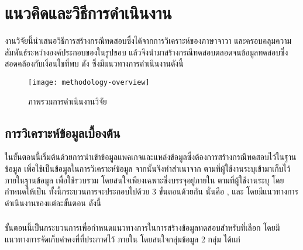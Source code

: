 \section{แนวคิดและวิธีการดำเนินงาน}
\label{sec:methodology}

งานวิจัยนี้นำเสนอวิธีการสร้างกรณีทดสอบซึ่งได้จากการวิเคราะห์{\StaticInformation}ของ{\sourcecode}ภาษาจาวา 
และครอบคลุมความสัมพันธ์ระหว่างองค์ประกอบของ{\software}ในรูปขอบ{\scg} 
แล้วจึงนำมาสร้างกรณีทดสอบตลอดจนข้อมูลทดสอบซึ่งสอดคล้องกับเงื่อนไขที่พบ ดัง 
ซึ่งมีแนวทางการดำเนินงานดังนี้

\begin{centering}
    \begin{figure}[ht!]
        \centering
        \texttt{[image: methodology-overview]}
        \caption{ภาพรวมการดำเนินงานวิจัย}
        \label{fig:methodologyoverview}
    \end{figure}
\end{centering}

\subsection{การวิเคราะห์ข้อมูลเบื้องต้น}
\label{subs:introsection}

ในขั้นตอนนี้เริ่มต้นด้วยการนำเข้าข้อมูลแพคเกจและแหล่งข้อมูล{\sourcecode}ซึ่ง{\tester}ต้องการสร้างกรณีทดสอบไว้ในฐานข้อมูล 
เพื่อใช้เป็นข้อมูลในการวิเคราะห์ข้อมูล{\sourcecode} จากนั้นจึงทำสำเนา{\sourcecode}จาก{\Repository} ตามที่ผู้ใช้งานระบุเข้ามาเก็บไว้ภายในฐานข้อมูล  เพื่อใช้รวบรวม{\StaticInformation} 
โดยสนใจเพียงเฉพาะ{\class}ซึ่งบรรจุอยู่ภายใน\FirstTimeDefine{\Package}{\PackageEN} ตามที่ผู้ใช้งานระบุ 
โดยกำหนดให้เป็น {\bf \CUT} ทั้งนี้กระบวนการจะประกอบไปด้วย 3 ขั้นตอนด้วยกัน นั่นคือ
{\constantExtracting}, {\graphCreation} 
และ{\sourcecodeInstrumention} 
โดยมีแนวทางการดำเนินงานของแต่ละขั้นตอน ดังนี้

\subsubsection{\constantExtracting}
\label{sec:sub:sub:sourceCodeExtract}

ขั้นตอนนี้เป็นกระบวนการเพื่อกำหนดแนวทางการในการสร้างข้อมูลทดสอบสำหรับ{\TestPath}ที่เลือก โดยมีแนวทางการจัดเก็บค่าคงที่ที่ประกาศไว้
ภายใน{\sourcecode} โดยสนใจกลุ่มข้อมูล 2 กลุ่ม ได้แก่

